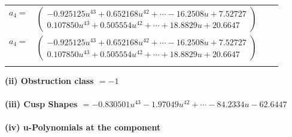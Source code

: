 \documentclass[1p]{elsarticle_modified}
\theoremstyle{definition}
\begin{document}
\begin{tabular}{m{7pt} m{180pt} m{7pt} m{180pt} }
\flushright $a_{4}=$&$\begin{pmatrix}-0.925125 u^{43}+0.652168 u^{42}+\cdots-16.2508 u+7.52727\\0.107850 u^{43}+0.505554 u^{42}+\cdots+18.8829 u+20.6647\end{pmatrix}$\\ \flushright $a_{4}=$&$\begin{pmatrix}-0.925125 u^{43}+0.652168 u^{42}+\cdots-16.2508 u+7.52727\\0.107850 u^{43}+0.505554 u^{42}+\cdots+18.8829 u+20.6647\end{pmatrix}$\\&\end{tabular}
\flushleft \textbf{(ii) Obstruction class $= -1$}\\~\\
\flushleft \textbf{(iii) Cusp Shapes $= -0.830501 u^{43}-1.97049 u^{42}+\cdots-84.2334 u-62.6447$}\\~\\
\newpage\renewcommand{\arraystretch}{1}
\flushleft \textbf{(iv) u-Polynomials at the component}\newline \\
\end{document}
